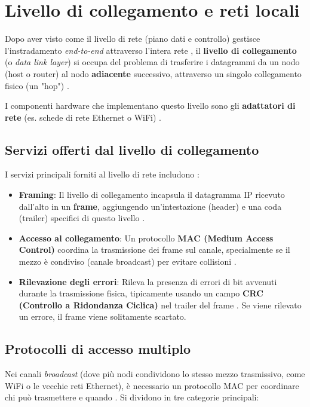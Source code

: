 \section{Livello di collegamento e reti locali}
Dopo aver visto come il livello di rete (piano dati e controllo) gestisce l'instradamento \textit{end-to-end} attraverso l'intera rete , il \textbf{livello di collegamento} (o \textit{data link layer}) si occupa del problema di trasferire i datagrammi da un nodo (host o router) al nodo \textbf{adiacente} successivo, attraverso un singolo collegamento fisico (un "hop") .

I componenti hardware che implementano questo livello sono gli \textbf{adattatori di rete} (es. schede di rete Ethernet o WiFi) .

\subsection{Servizi offerti dal livello di collegamento}
I servizi principali forniti al livello di rete includono :
\begin{itemize}
    \item \textbf{Framing}: Il livello di collegamento incapsula il datagramma IP ricevuto dall'alto in un \textbf{frame}, aggiungendo un'intestazione (header) e una coda (trailer) specifici di questo livello .
    \item \textbf{Accesso al collegamento}: Un protocollo \textbf{MAC (Medium Access Control)} coordina la trasmissione dei frame sul canale, specialmente se il mezzo è condiviso (canale broadcast) per evitare collisioni .
    \item \textbf{Rilevazione degli errori}: Rileva la presenza di errori di bit avvenuti durante la trasmissione fisica, tipicamente usando un campo \textbf{CRC (Controllo a Ridondanza Ciclica)} nel trailer del frame . Se viene rilevato un errore, il frame viene solitamente scartato.
\end{itemize}

\subsection{Protocolli di accesso multiplo}
Nei canali \textit{broadcast} (dove più nodi condividono lo stesso mezzo trasmissivo, come WiFi o le vecchie reti Ethernet), è necessario un protocollo MAC per coordinare chi può trasmettere e quando . Si dividono in tre categorie principali:

